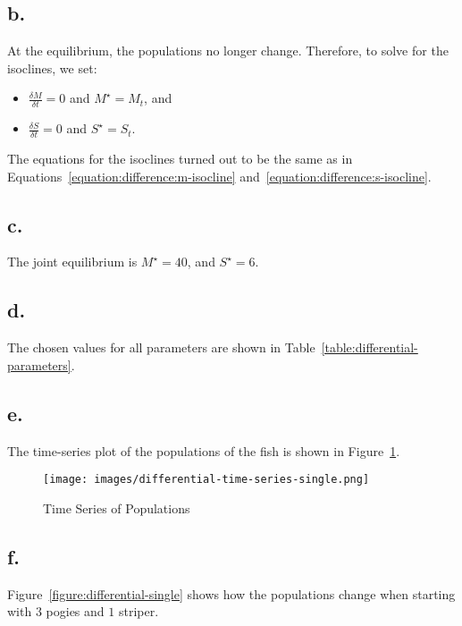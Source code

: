 \subsection*{b.}

At the equilibrium, the populations no longer change.
Therefore, to solve for the isoclines, we set:
\begin{itemize}
    \item $\frac{\delta M}{\delta t} = 0$ and $M^{\star} = M_t$, and
    \item $\frac{\delta S}{\delta t} = 0$ and $S^{\star} = S_t$.
\end{itemize}

The equations for the isoclines turned out to be the same as in Equations~\ref{equation:difference:m-isocline} and~\ref{equation:difference:s-isocline}.


\subsection*{c.}

The joint equilibrium is $M^{\star} = 40$, and $S^{\star} = 6$.


\subsection*{d.}

The chosen values for all parameters are shown in Table~\ref{table:differential-parameters}.


\subsection*{e.}

The time-series plot of the populations of the fish is shown in Figure~\ref{figure:differential-time-series-single}.

\begin{figure}[ht!]
    \centering
    \texttt{[image: images/differential-time-series-single.png]}
    \caption{Time Series of Populations}
    \label{figure:differential-time-series-single}
\end{figure}


\subsection*{f.}

Figure~\ref{figure:differential-single} shows how the populations change when starting with $3$ pogies and $1$ striper.

